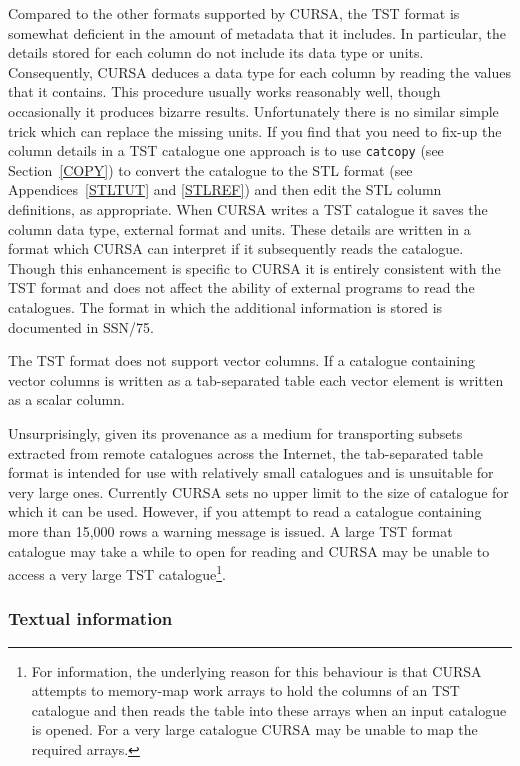 \documentclass[twoside,11pt]{article}
\renewcommand{\_}{\texttt{\symbol{95}}}
\begin{document}
Compared to the other formats supported by CURSA, the TST format is
somewhat deficient in the amount of metadata that it includes.  In
particular, the details stored for each column do not include its data
type or units.  Consequently, CURSA deduces a data type for each column
by reading the values that it contains.  This procedure usually works
reasonably well, though occasionally it produces bizarre results.
Unfortunately there is no similar simple trick which can replace the
missing units.  If you find that you need to fix-up the column details in
a TST catalogue one approach is to use {\tt catcopy} (see Section~\ref{COPY})
to convert the catalogue to the STL format (see Appendices~\ref{STLTUT}
and \ref{STLREF}) and then edit the STL column definitions, as appropriate.
When CURSA writes a TST catalogue it saves the column data type,
external format and units.  These details are written in a format which
CURSA can interpret if it subsequently reads the catalogue.  Though this
enhancement is specific to CURSA it is entirely consistent with the TST
format and does not affect the ability of external programs to read the
catalogues.  The format in which the additional information is stored is
documented in SSN/75.

The TST format does not support vector columns.  If a catalogue
containing vector columns is written as a tab-separated table each vector
element is written as a scalar column.

Unsurprisingly, given its provenance as a medium for transporting
subsets extracted from remote catalogues across the Internet, the
tab-separated table format is intended for use with relatively small
catalogues and is unsuitable for very large ones.  Currently CURSA sets no
upper limit to the size of catalogue for which it can be used.  However,
if you attempt to read a catalogue containing more than 15,000 rows a
warning message is issued.  A large TST format catalogue may take a while
to open for reading and CURSA may be unable to access a very large TST
catalogue\footnote{For information, the underlying reason for this
behaviour is that CURSA attempts to memory-map work arrays to hold the
columns of an TST catalogue and then reads the table into these arrays
when an input catalogue is opened.  For a very large catalogue CURSA may
be unable to map the required arrays.}.

\subsubsection{Textual information}
\end{document}
